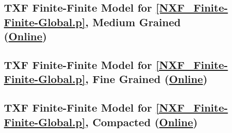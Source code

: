 \documentclass{easychair}
\begin{document}
\newpage
\subsection{TXF Finite-Finite Model for \ref{NXF_Finite-Finite-Global.p}, Medium Grained \\
(\href{https://raw.githubusercontent.com/GeoffsPapers/InterpretationFormat/master/Examples/NXF_Finite-Finite-Global_Medium.s}{Online})}
\label{NXF_Finite-Finite-Global_Medium.s}
\begin{small}

\end{small}

\newpage
\subsection{TXF Finite-Finite Model for \ref{NXF_Finite-Finite-Global.p}, Fine Grained
(\href{https://raw.githubusercontent.com/GeoffsPapers/InterpretationFormat/master/Examples/NXF_Finite-Finite-Global_Fine.s}{Online})}
\label{NXF_Finite-Finite-Global_Fine.s}
\begin{small}

\end{small}

\newpage
\subsection{TXF Finite-Finite Model for \ref{NXF_Finite-Finite-Global.p}, Compacted
(\href{https://raw.githubusercontent.com/GeoffsPapers/InterpretationFormat/master/Examples/NXF_Finite-Finite-Global_Compact.s}{Online})}
\label{NXF_Finite-Finite-Global_Compact.s}
\begin{small}

\end{small}

\end{document}
